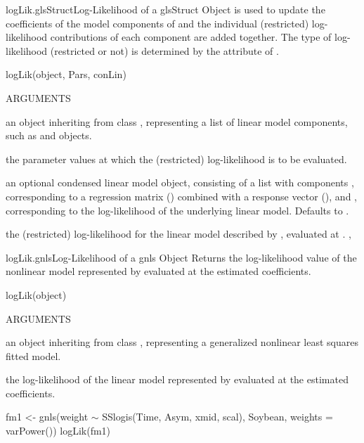 \documentclass[pdftex]{article} \usepackage{url,graphicx}
\renewcommand{\Twiddle}{\mbox{\(\sim\)}}
\begin{document}
\begin{Helpfile}{logLik.glsStruct}{Log-Likelihood of a glsStruct Object}
 is used to update the coefficients of the model components
of  and the individual (restricted) log-likelihood
contributions of each component are added together. The type of
log-likelihood (restricted or not) is determined by the
 attribute of .
\begin{Example}
logLik(object, Pars, conLin)
\end{Example}
\begin{Argument}{ARGUMENTS}
\item[\Co{object:}]
an object inheriting from class ,
representing a list of linear model components, such as
 and  objects.
\item[\Co{Pars:}]
the parameter values at which the (restricted)
log-likelihood is to be evaluated.
\item[\Co{conLin:}]
an optional condensed linear model object, consisting of
a list with components , corresponding to a regression
matrix () combined with a response vector (), and 
, corresponding to the log-likelihood of the
underlying linear model. Defaults to .
\end{Argument}
the (restricted) log-likelihood for the linear model described by
, evaluated at .
, 
\end{Helpfile}
\begin{Helpfile}{logLik.gnls}{Log-Likelihood of a gnls Object}
Returns the log-likelihood value of the nonlinear model represented by
 evaluated at the estimated coefficients.
\begin{Example}
logLik(object)
\end{Example}
\begin{Argument}{ARGUMENTS}
\item[\Co{object:}]
an object inheriting from class , representing
a generalized nonlinear least squares fitted model.
\end{Argument}
the log-likelihood of the linear model represented by
 evaluated at the estimated coefficients.
\need 15pt
\vspace{-16pt}
\begin{Example}
fm1 <- gnls(weight {\Twiddle} SSlogis(Time, Asym, xmid, scal), Soybean,
            weights = varPower())
logLik(fm1)
\end{Example}
\end{Helpfile}
\end{document}
